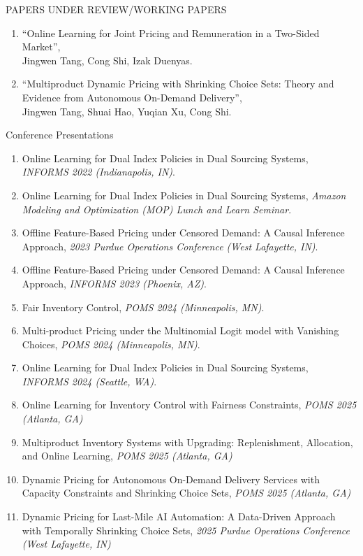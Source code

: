 \documentclass{resume}
\begin{document}
\begin{rSection}{PAPERS UNDER REVIEW/WORKING PAPERS}
\begin{enumerate}

    \item ``Online Learning for Joint Pricing and Remuneration in a Two-Sided Market'', \\ Jingwen Tang, Cong Shi, Izak Duenyas.
	

  
  \item ``Multiproduct Dynamic Pricing with Shrinking Choice Sets: Theory and Evidence from Autonomous On-Demand Delivery'', \\ Jingwen Tang, Shuai Hao, Yuqian Xu, Cong Shi. 
  
\end{enumerate}
\end{rSection}

\begin{rSection}{Conference Presentations}
\begin{enumerate}
  \item Online Learning for Dual Index Policies in Dual Sourcing Systems, \textit{INFORMS 2022 (Indianapolis, IN)}.
  \item Online Learning for Dual Index Policies in Dual Sourcing Systems, \textit{Amazon Modeling and Optimization (MOP) Lunch and Learn Seminar}.
  \item Offline Feature-Based Pricing under Censored Demand: A Causal Inference Approach, \textit{2023 Purdue Operations Conference (West Lafayette, IN)}. 
  \item Offline Feature-Based Pricing under Censored Demand: A Causal Inference Approach, \textit{INFORMS 2023 (Phoenix, AZ)}. 
  \item Fair Inventory Control, \textit{POMS 2024 (Minneapolis, MN)}. 
  \item Multi-product Pricing under the Multinomial Logit model with Vanishing Choices, \textit{POMS 2024 (Minneapolis, MN)}. 
  \item Online Learning for Dual Index Policies in Dual Sourcing Systems, \textit{INFORMS 2024 (Seattle, WA)}. 
  \item Online Learning for Inventory Control with Fairness Constraints, \textit{POMS 2025 (Atlanta, GA)}
  \item Multiproduct Inventory Systems with Upgrading: Replenishment, Allocation, and Online Learning, \textit{POMS 2025 (Atlanta, GA)}
  \item Dynamic Pricing for Autonomous On-Demand Delivery Services with Capacity Constraints and Shrinking Choice Sets, \textit{POMS 2025 (Atlanta, GA)}
  \item Dynamic Pricing for Last-Mile AI Automation: 
A Data-Driven Approach with Temporally Shrinking Choice Sets, \textit{2025 Purdue Operations Conference (West Lafayette, IN)}
\end{enumerate}
\end{rSection}
\end{document}
